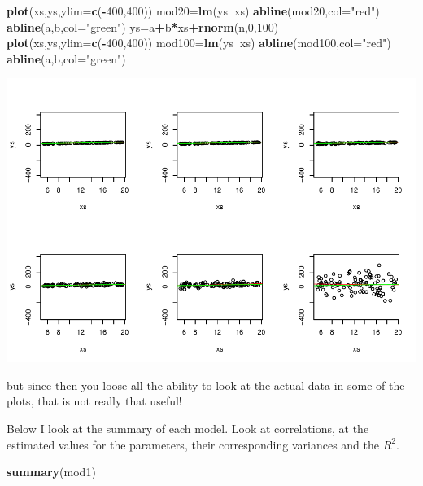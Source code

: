 \documentclass[
]{book}
\newenvironment{Shaded}{\begin{snugshade}}{\end{snugshade}}
\newcommand{\DataTypeTok}[1]{\textcolor[rgb]{0.13,0.29,0.53}{#1}}
\newcommand{\DecValTok}[1]{\textcolor[rgb]{0.00,0.00,0.81}{#1}}
\newcommand{\KeywordTok}[1]{\textcolor[rgb]{0.13,0.29,0.53}{\textbf{#1}}}
\newcommand{\NormalTok}[1]{#1}
\newcommand{\OperatorTok}[1]{\textcolor[rgb]{0.81,0.36,0.00}{\textbf{#1}}}
\newcommand{\StringTok}[1]{\textcolor[rgb]{0.31,0.60,0.02}{#1}}
\begin{document}
\begin{Shaded}
\begin{Highlighting}[]
\KeywordTok{plot}\NormalTok{(xs,ys,}\DataTypeTok{ylim=}\KeywordTok{c}\NormalTok{(}\OperatorTok{-}\DecValTok{400}\NormalTok{,}\DecValTok{400}\NormalTok{))}
\NormalTok{mod20=}\KeywordTok{lm}\NormalTok{(ys}\OperatorTok{~}\NormalTok{xs)}
\KeywordTok{abline}\NormalTok{(mod20,}\DataTypeTok{col=}\StringTok{"red"}\NormalTok{)}
\KeywordTok{abline}\NormalTok{(a,b,}\DataTypeTok{col=}\StringTok{"green"}\NormalTok{)}
\NormalTok{ys=a}\OperatorTok{+}\NormalTok{b}\OperatorTok{*}\NormalTok{xs}\OperatorTok{+}\KeywordTok{rnorm}\NormalTok{(n,}\DecValTok{0}\NormalTok{,}\DecValTok{100}\NormalTok{)}
\KeywordTok{plot}\NormalTok{(xs,ys,}\DataTypeTok{ylim=}\KeywordTok{c}\NormalTok{(}\OperatorTok{-}\DecValTok{400}\NormalTok{,}\DecValTok{400}\NormalTok{))}
\NormalTok{mod100=}\KeywordTok{lm}\NormalTok{(ys}\OperatorTok{~}\NormalTok{xs)}
\KeywordTok{abline}\NormalTok{(mod100,}\DataTypeTok{col=}\StringTok{"red"}\NormalTok{)}
\KeywordTok{abline}\NormalTok{(a,b,}\DataTypeTok{col=}\StringTok{"green"}\NormalTok{)}
\end{Highlighting}
\end{Shaded}

\includegraphics{ECOMODbook_files/figure-latex/a6.28-1.pdf}

but since then you loose all the ability to look at the actual data in some of the plots, that is not really that useful!

Below I look at the summary of each model. Look at correlations, at the estimated values for the parameters, their corresponding variances and the \(R^2\).

\begin{Shaded}
\begin{Highlighting}[]
\KeywordTok{summary}\NormalTok{(mod1)}
\end{Highlighting}
\end{Shaded}
\end{document}
